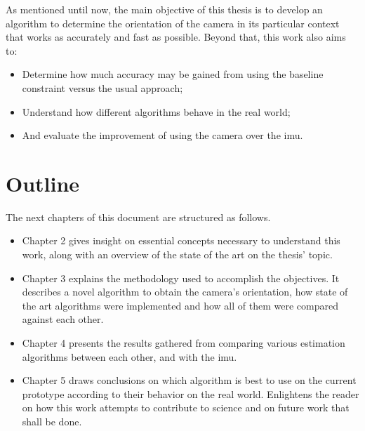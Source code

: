 As mentioned until now, the main objective of this thesis is to develop an algorithm to determine the orientation of the camera in its particular context that works as accurately and fast as possible. Beyond that, this work also aims to:

\begin{itemize}
\item Determine how much accuracy may be gained from using the baseline constraint versus the usual approach;
\item Understand how different algorithms behave in the real world;
\item And evaluate the improvement of using the camera over the  \acrshort{imu}.
\end{itemize}

 		
\section{Outline}
\label{cha1:outline}

The next chapters of this document are structured as follows.
\begin{itemize}
\item	Chapter 2 gives insight on essential concepts necessary to understand this work, along with an overview of the state of the art on the thesis' topic.
	
\item	Chapter 3 explains the methodology used to accomplish the objectives. It describes a novel algorithm to obtain the camera's orientation, how state of the art algorithms were implemented and how all of them were compared against each other. 
	
\item	Chapter 4 presents the results gathered from comparing various estimation algorithms between each other, and with the \acrshort{imu}.
	
\item	Chapter 5 draws conclusions on which algorithm is best to use on the current prototype according to their behavior on the real world. Enlightens the reader on how this work attempts to contribute to science and on future work that shall be done.
	
\end{itemize}



